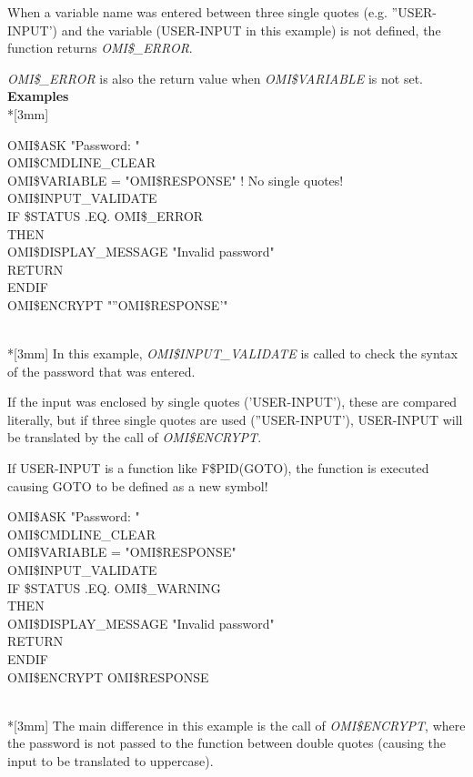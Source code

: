 \documentclass[a4paper]{book}
\renewcommand{\indent}{\hspace*{5mm}}
\begin{document}
When a variable name was entered between three single quotes (e.g. ''USER-INPUT') 
and the variable (USER-INPUT in this example) is not defined, the function 
returns \textsl{OMI{\$}{\_}ERROR}.

\textsl{OMI{\$}{\_}ERROR} is also the return value when \textsl{OMI{\$}VARIABLE} is not set.\\[3mm]
\textbf{Examples}\\*[3mm]
\begin{textsf}
\indent{\$} OMI{\$}ASK "Password: " \\
\indent{\$} OMI{\$}CMDLINE{\_}CLEAR \\
\indent{\$} OMI{\$}VARIABLE = "OMI{\$}RESPONSE" ! No single quotes! \\
\indent{\$} OMI{\$}INPUT{\_}VALIDATE \\
\indent{\$} IF {\$}STATUS .EQ. OMI{\$}{\_}ERROR \\
\indent{\$}   THEN \\
\indent{\$}     OMI{\$}DISPLAY{\_}MESSAGE "Invalid password" \\
\indent{\$}     RETURN \\
\indent{\$} ENDIF \\
\indent{\$} OMI{\$}ENCRYPT "''OMI{\$}RESPONSE'" \\
\end{textsf}\\*[3mm]
In this example, \textsl{OMI{\$}INPUT{\_}VALIDATE} is called to check the syntax of 
the password that was entered.

If the input was enclosed by single quotes ('USER-INPUT'), these are compared 
literally, but if three single quotes are used (''USER-INPUT'), USER-INPUT will be 
translated by the call of \textsl{OMI{\$}ENCRYPT}.

If USER-INPUT is a function like F{\$}PID(GOTO), the function is executed causing 
GOTO to be defined as a new symbol!\\[3mm]
\begin{textsf}
\indent{\$} OMI{\$}ASK "Password: " \\
\indent{\$} OMI{\$}CMDLINE{\_}CLEAR \\
\indent{\$} OMI{\$}VARIABLE = "OMI{\$}RESPONSE" \\
\indent{\$} OMI{\$}INPUT{\_}VALIDATE \\
\indent{\$} IF {\$}STATUS .EQ. OMI{\$}{\_}WARNING \\
\indent{\$}   THEN \\
\indent{\$}     OMI{\$}DISPLAY{\_}MESSAGE "Invalid password" \\
\indent{\$}     RETURN \\
\indent{\$} ENDIF \\
\indent{\$} OMI{\$}ENCRYPT OMI{\$}RESPONSE \\
\end{textsf}\\*[3mm]
The main difference in this example is the call of \textsl{OMI{\$}ENCRYPT}, where the 
password is not passed to the function between double quotes (causing the 
input to be translated to uppercase).
\end{document}
